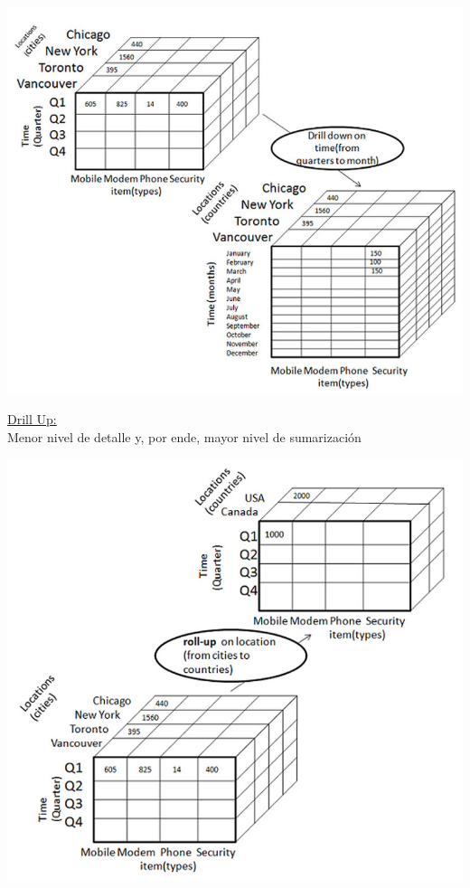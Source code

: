 \documentclass{fancyslides}
\begin{document}
\begin{frame}
\misc
{
  \begin{center}
  \includegraphics[scale=0.5]{drill_down}
  \end{center}
}
\end{frame}


\begin{frame}
\misc
{
  \underline{Drill Up:}\\
  Menor nivel de detalle y, por ende, mayor nivel de sumarización
}
\end{frame}

\begin{frame}
\misc
{
  \begin{center}
  \includegraphics[scale=0.2]{drill_up}
  \end{center}
}
\end{frame}
\end{document}
